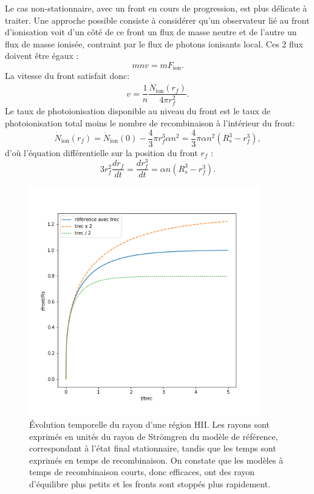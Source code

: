 Le cas non-stationnaire, avec un front en cours de progression, est plus délicate à traiter. Une approche possible consiste à considérer qu'un observateur lié au front d'ionisation voit d'un côté de ce front un flux de masse neutre et de l'autre un flux de masse ionisée, contraint par le flux de photons ionisants local. Ces 2 flux doivent être égaux :
\begin{equation}
m n v = m F_\mathrm{ion}.
\end{equation}
La vitesse du front satisfait donc:
\begin{equation}
v=\frac{1}{n}\frac{\dot N_\mathrm{ion}(r_f)}{4\pi r_f^2}.
\end{equation}
Le taux de photoionisation disponible au niveau du front est le taux de photoionisation total moins le nombre de recombinaison à l'intérieur du front:
\begin{equation}
\dot N_\mathrm{ion}(r_f)=\dot N_\mathrm{ion}(0)-\frac{4}{3}\pi r_f^3\alpha n^2=\frac{4}{3}\pi \alpha n^2 (R_s^3-r_f^3),
\end{equation}
d'où l'équation différentielle sur la position du front $r_f$ :
\begin{equation}
3r_f^2\frac{d r_f}{dt}=\frac{dr_f^3}{dt}=\alpha n  (R_s^3-r_f^3).
\end{equation}

\begin{figure}[htbp]
	\centering
		\includegraphics[height=10cm]{figs/strom.png}
		\caption[Évolution temporelle de la position d'un front ionisant]{Évolution temporelle du rayon d'une région HII. Les rayons sont exprimés en unités du rayon de Strömgren du modèle de référence, correspondant à l'état final stationnaire, tandis que les temps sont exprimés en temps de recombinaison. On constate que les modèles à temps de recombinaison courts, donc efficaces, ont des rayon d'équilibre plus petits et les fronts sont stoppés plus rapidement.}
	\label{f:strom}
\end{figure}

